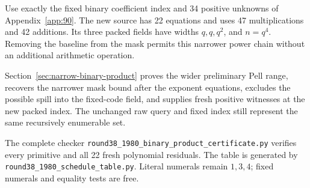 \documentclass[11pt,letterpaper]{article}
\theoremstyle{definition}
\theoremstyle{remark}
\numberwithin{equation}{section}
\newcommand{\file}[1]{\texttt{#1}}
\begin{document}
Use exactly the fixed binary coefficient index and 34 positive unknowns
of Appendix~\ref{app:90}. The new source has 22 equations and uses
47 multiplications and 42 additions. Its three packed fields have widths
$q,q,q^2$, and $n=q^4$. Removing the baseline from the mask permits
this narrower power chain without an additional arithmetic operation.

Section~\ref{sec:narrow-binary-product} proves the wider preliminary
Pell range, recovers the narrower mask bound after the exponent equations,
excludes the possible spill into the fixed-code field, and supplies
fresh positive witnesses at the new packed index. The unchanged raw
query and fixed index still represent the same recursively enumerable set.

The complete checker
\file{round38\_1980\_binary\_product\_certificate.py}
verifies every primitive and all 22 fresh polynomial residuals.
The table is generated by
\file{round38\_1980\_schedule\_table.py}.
Literal numerals remain $1,3,4$; fixed numerals and equality tests are free.

\small

\end{document}
